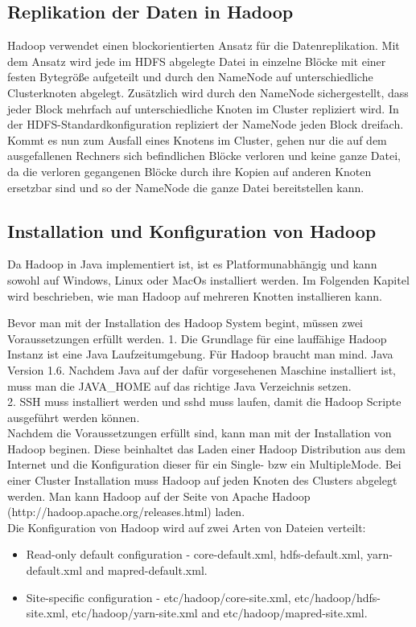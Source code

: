 \subsection{Replikation der Daten in Hadoop}
Hadoop verwendet einen blockorientierten Ansatz für die Datenreplikation. Mit dem Ansatz wird jede im HDFS abgelegte Datei in einzelne Blöcke mit einer festen Bytegröße aufgeteilt und durch den NameNode auf unterschiedliche Clusterknoten abgelegt. Zusätzlich wird durch den NameNode sichergestellt, dass jeder Block mehrfach auf unterschiedliche Knoten im Cluster repliziert wird.
In der HDFS-Standardkonfiguration repliziert der NameNode jeden Block dreifach. Kommt es nun zum Ausfall eines Knotens im Cluster, gehen nur die auf dem ausgefallenen Rechners sich befindlichen Blöcke verloren und keine ganze Datei, da die verloren gegangenen Blöcke durch ihre Kopien auf anderen Knoten ersetzbar sind und so der NameNode die ganze Datei bereitstellen kann.
\cite{replikation}

\subsection{Installation und Konfiguration von Hadoop}
Da Hadoop in Java implementiert ist, ist es Platformunabhängig und kann sowohl auf Windows, Linux oder MacOs installiert werden.
Im Folgenden Kapitel wird beschrieben, wie man Hadoop auf mehreren Knotten installieren kann. 

Bevor man mit der Installation des Hadoop System begint, müssen zwei Voraussetzungen erfüllt werden.
1. Die Grundlage für eine lauffähige Hadoop Instanz ist eine Java Laufzeitumgebung. Für Hadoop braucht man mind. Java Version 1.6.
Nachdem Java auf der dafür vorgesehenen Maschine installiert ist, muss man die JAVA\_HOME auf das richtige Java Verzeichnis setzen.\\
2. SSH muss installiert werden und sshd muss laufen, damit die Hadoop Scripte ausgeführt werden können.\\
Nachdem die Voraussetzungen erfüllt sind, kann man mit der Installation von Hadoop beginen. Diese beinhaltet das Laden einer Hadoop Distribution aus dem Internet und die Konfiguration dieser für ein Single- bzw ein MultipleMode. Bei einer Cluster Installation muss Hadoop auf jeden Knoten des Clusters abgelegt werden.
Man kann Hadoop auf der Seite von Apache Hadoop  (http://hadoop.apache.org/releases.html) laden.\\
Die Konfiguration von Hadoop wird auf zwei Arten von Dateien verteilt:
\begin{itemize}
\item Read-only default configuration - core-default.xml, hdfs-default.xml, yarn-default.xml and mapred-default.xml.
\item Site-specific configuration - etc/hadoop/core-site.xml, etc/hadoop/hdfs-site.xml, etc/hadoop/yarn-site.xml and etc/hadoop/mapred-site.xml.
\end{itemize}
\cite{hadoopConfiguration}


